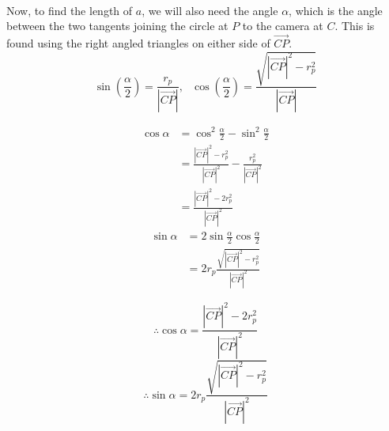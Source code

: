 \documentclass{article}
\newcommand\cpv{\overrightarrow{CP}\xspace}
\begin{document}
	\paragraph{} 
	Now, to find the length of $a$, we will also need the angle $\alpha$, which is the angle between the two tangents joining the circle at $P$ 
	to the camera at $C$. This is found using the right angled triangles on either side of $\cpv$.
	$$\sin\left(\frac{\alpha}{2}\right)  = \frac{r_p}{\left|\cpv\right|},\text{   } \cos{\left(\frac{\alpha}{2}\right)} = \frac{\sqrt{\left|\cpv\right|^2 - r_p^2}}{\left|\cpv\right|} $$
	\pagebreak
	\begin{multicols}{2}
	\begin{align*}
		\cos{\alpha} & = \cos^2{\frac{\alpha}{2}} -  \sin^2{\frac{\alpha}{2}}\\
					& = \frac{\left|\cpv\right|^2 - r_p^2}{\left|\cpv\right|^2} - \frac{r_p^2}{\left|\cpv\right|^2}\\
					& = \frac{\left|\cpv\right|^2 - 2 r_p^2}{\left|\cpv\right|^2}
	\end{align*}
	\columnbreak
	\begin{align*}
		\sin{\alpha} & = 2 \sin{\frac{\alpha}{2}} \cos{\frac{\alpha}{2}}\\
					& = 2 r_p \frac{\sqrt{\left|\cpv\right|^2 - r_p^2}}{\left|\cpv\right|^2}
	\end{align*}
	\end{multicols}
	\begin{multicols}{2}
	\begin{equation}
		\therefore \cos{\alpha} = \frac{\left|\cpv\right|^2 - 2 r_p^2}{\left|\cpv\right|^2}
	\end{equation}
	\columnbreak
	\begin{equation}
		\therefore \sin{\alpha} = 2 r_p\frac{\sqrt{\left|\cpv\right|^2 - r_p^2}}{\left|\cpv\right|^2}
	\end{equation}
	\end{multicols}
\end{document}
